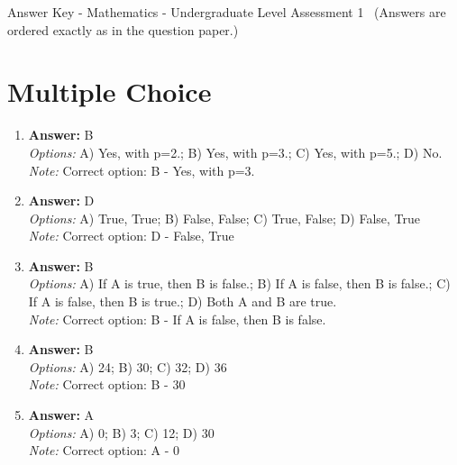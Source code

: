 \documentclass[12pt]{article}
\begin{document}
\begin{center}
Answer Key - Mathematics - Undergraduate Level Assessment 1 \
\small (Answers are ordered exactly as in the question paper.)
\end{center}

\section*{Multiple Choice}
\begin{enumerate}[label=\arabic*.]
\item \textbf{Answer:} B
\\ \textit{Options:} A) Yes, with p=2.; B) Yes, with p=3.; C) Yes, with p=5.; D) No.
\\ \textit{Note:} Correct option: B - Yes, with p=3.
\item \textbf{Answer:} D
\\ \textit{Options:} A) True, True; B) False, False; C) True, False; D) False, True
\\ \textit{Note:} Correct option: D - False, True
\item \textbf{Answer:} B
\\ \textit{Options:} A) If A is true, then B is false.; B) If A is false, then B is false.; C) If A is false, then B is true.; D) Both A and B are true.
\\ \textit{Note:} Correct option: B - If A is false, then B is false.
\item \textbf{Answer:} B
\\ \textit{Options:} A) 24; B) 30; C) 32; D) 36
\\ \textit{Note:} Correct option: B - 30
\item \textbf{Answer:} A
\\ \textit{Options:} A) 0; B) 3; C) 12; D) 30
\\ \textit{Note:} Correct option: A - 0
\end{enumerate}
\end{document}
